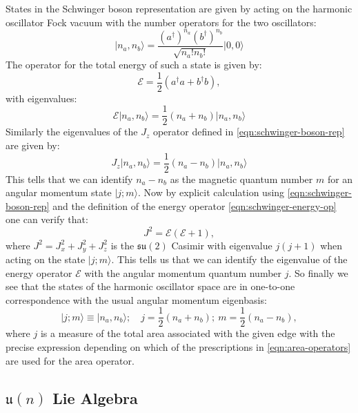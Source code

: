 \documentclass[twocolumn,final,aps,nofootinbib,nobibnotes]{revtex4-2}
\newcommand{\mc}[1]{\mathcal{#1}}
\newcommand{\mf}[1]{\mathfrak{#1}}
\newcommand{\ket}[1]{\vert #1 \rangle}
\newcommand{\onehalf}{\frac{1}{2}}
\begin{document}
States in the Schwinger boson representation are given by acting on the harmonic oscillator Fock vacuum with the number operators for the two oscillators:
\begin{equation}\label{eqn:schwinger-states}
	\ket{n_a, n_b} = \frac{(a^\dag)^{n_a} (b^\dag)^{n_b}}{\sqrt{n_a ! n_b !}}\ket{0,0}
\end{equation}
The operator for the total energy of such a state is given by:
\begin{equation}\label{eqn:schwinger-energy-op}
	\mc{E} = \onehalf(a^\dag a + b^\dag b),
\end{equation}
with eigenvalues:
\begin{equation}\label{eqn:schwinger-energy-eigenvalues}
	\mc{E} \ket{n_a, n_b} = \onehalf (n_a + n_b) \ket{n_a, n_b}
\end{equation}
Similarly the eigenvalues of the $ J_z $ operator defined in \eqref{eqn:schwinger-boson-rep} are given by:
\begin{equation}\label{eqn:j-z-defn}
	J_z \ket{n_a, n_b} = \onehalf (n_a - n_b) \ket{n_a, n_b}
\end{equation}
This tells that we can identify $ n_a - n_b $ as the magnetic quantum number $ m $ for an angular momentum state $ \ket{j;m} $. Now by explicit calculation using \eqref{eqn:schwinger-boson-rep} and the definition of the energy operator \eqref{eqn:schwinger-energy-op} one can verify that:
\begin{equation}\label{eqn:j-square-defn}
	J^2 = \mc{E}(\mc{E}+1),
\end{equation}
where $ J^2 = J_x^2 + J_y^2 + J_z^2 $ is the $ \mf{su}(2) $ Casimir with eigenvalue $ j(j+1) $ when acting on the state $ \ket{j;m} $. This tells us that we can identify the eigenvalue of the energy operator $ \mc{E} $ with the angular momentum quantum number $ j $. So finally we see that the states of the harmonic oscillator space are in one-to-one correspondence with the usual angular momentum eigenbasis:
\begin{equation}\label{eqn:state-correspondence}
	\ket{j;m} \equiv \ket{n_a, n_b}; \quad j = \onehalf(n_a + n_b);~ m = \onehalf(n_a - n_b),
\end{equation}
where $ j $  is a measure of the total area associated with the given edge with the precise expression depending on which of the prescriptions in \eqref{eqn:area-operators} are used for the area operator.

\subsection{$ \mf{u}(n) $ Lie Algebra}\label{sec:u-n-algebra}
\end{document}
